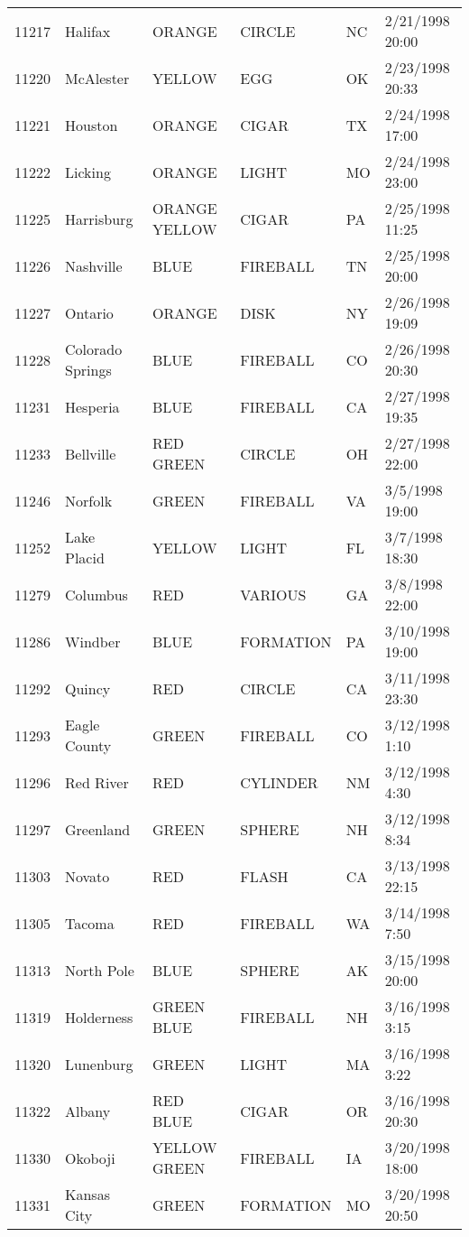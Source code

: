 \begin{tabular}{llllll}
11217 & Halifax & ORANGE & CIRCLE & NC & 2/21/1998 20:00 \\
11220 & McAlester & YELLOW & EGG & OK & 2/23/1998 20:33 \\
11221 & Houston & ORANGE & CIGAR & TX & 2/24/1998 17:00 \\
11222 & Licking & ORANGE & LIGHT & MO & 2/24/1998 23:00 \\
11225 & Harrisburg & ORANGE YELLOW & CIGAR & PA & 2/25/1998 11:25 \\
11226 & Nashville & BLUE & FIREBALL & TN & 2/25/1998 20:00 \\
11227 & Ontario & ORANGE & DISK & NY & 2/26/1998 19:09 \\
11228 & Colorado Springs & BLUE & FIREBALL & CO & 2/26/1998 20:30 \\
11231 & Hesperia & BLUE & FIREBALL & CA & 2/27/1998 19:35 \\
11233 & Bellville & RED GREEN & CIRCLE & OH & 2/27/1998 22:00 \\
11246 & Norfolk & GREEN & FIREBALL & VA & 3/5/1998 19:00 \\
11252 & Lake Placid & YELLOW & LIGHT & FL & 3/7/1998 18:30 \\
11279 & Columbus & RED & VARIOUS & GA & 3/8/1998 22:00 \\
11286 & Windber & BLUE & FORMATION & PA & 3/10/1998 19:00 \\
11292 & Quincy & RED & CIRCLE & CA & 3/11/1998 23:30 \\
11293 & Eagle County & GREEN & FIREBALL & CO & 3/12/1998 1:10 \\
11296 & Red River & RED & CYLINDER & NM & 3/12/1998 4:30 \\
11297 & Greenland & GREEN & SPHERE & NH & 3/12/1998 8:34 \\
11303 & Novato & RED & FLASH & CA & 3/13/1998 22:15 \\
11305 & Tacoma & RED & FIREBALL & WA & 3/14/1998 7:50 \\
11313 & North Pole & BLUE & SPHERE & AK & 3/15/1998 20:00 \\
11319 & Holderness & GREEN BLUE & FIREBALL & NH & 3/16/1998 3:15 \\
11320 & Lunenburg & GREEN & LIGHT & MA & 3/16/1998 3:22 \\
11322 & Albany & RED BLUE & CIGAR & OR & 3/16/1998 20:30 \\
11330 & Okoboji & YELLOW GREEN & FIREBALL & IA & 3/20/1998 18:00 \\
11331 & Kansas City & GREEN & FORMATION & MO & 3/20/1998 20:50 \\

\end{tabular}
